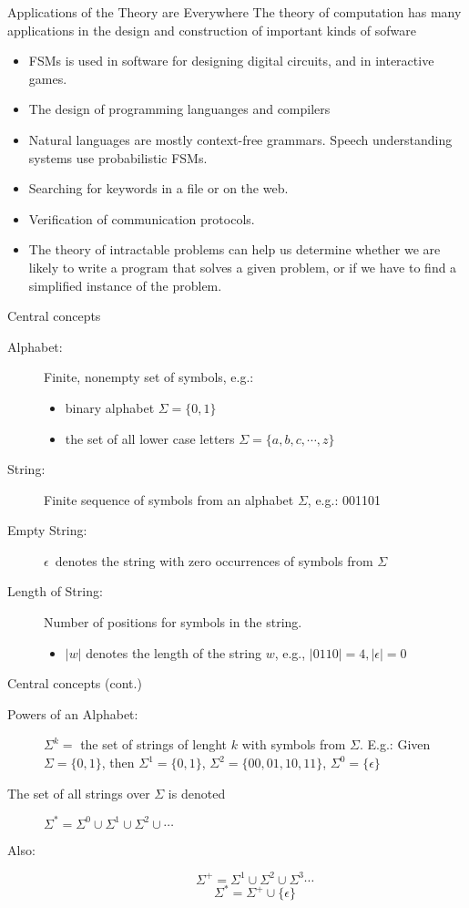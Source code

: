 \documentclass{prosper}%
\newcommand{\egk}{\mbox{$\epsilon$}}
\begin{document}
\begin{slide}{\large Applications of the Theory are Everywhere}
The theory of computation has many applications in the design and construction of important  kinds of sofware
\begin{itemize}
\item FSMs is used in software for designing digital circuits, and in interactive games.
\item The design of programming languanges and compilers
\item Natural languages are mostly context-free grammars. Speech understanding systems use probabilistic FSMs.
\item Searching for keywords in a file or on the web.
\item Verification of communication protocols.
\item The theory of intractable problems can help us determine whether we are likely to write a program that solves a given problem, or if we have to find a simplified instance of the problem.
\end{itemize}
\end{slide}


\begin{slide}{Central concepts}
\begin{description}
\item[Alphabet:] Finite, nonempty set of symbols, e.g.:
\begin{itemize}
\item binary alphabet $\Sigma = \{0,1\}$
\item the set of all lower case letters $\Sigma=\{a,b,c,\cdots,z\}$
\end{itemize}
\item[String:] Finite sequence of symbols from an alphabet $\Sigma$, e.g.: 001101
\item[Empty String:] \egk\ denotes the string with zero occurrences of symbols from $\Sigma$
\item[Length of String:] Number of positions for symbols in the string. 
\begin{itemize}
\item $|w|$ denotes the length of the string $w$, e.g., $|0110|=4, |\egk |=0$
\end{itemize}
\end{description}
\end{slide}

\begin{slide}{Central concepts (cont.)}
\begin{description}
\item[Powers of an Alphabet:] $\Sigma^k=$ the set of strings of lenght $k$ with symbols from $\Sigma$. E.g.: Given $\Sigma=\{0,1\}$, then  $\Sigma^1=\{0,1\}$, $\Sigma^2=\{00,01,10,11\}$, $\Sigma^0=\{\egk\}$
\item[The set of all strings over $\Sigma$ is denoted] $\Sigma^*=\Sigma^0\cup\Sigma^1\cup\Sigma^2\cup\cdots$  
\item[Also:] 
\[\Sigma^+=\Sigma^1\cup\Sigma^2\cup\Sigma^3\cdots\]
\[\Sigma^*=\Sigma^+\cup\{\egk\}\]
\end{description}
\end{slide}
\end{document}
